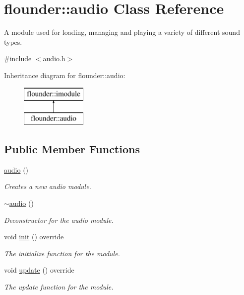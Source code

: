 \hypertarget{classflounder_1_1audio}{}\section{flounder\+:\+:audio Class Reference}
\label{classflounder_1_1audio}


A module used for loading, managing and playing a variety of different sound types.  




{\ttfamily \#include $<$audio.\+h$>$}

Inheritance diagram for flounder\+:\+:audio\+:\begin{figure}[H]
\begin{center}
\leavevmode
\includegraphics[height=2.000000cm]{classflounder_1_1audio}
\end{center}
\end{figure}
\subsection*{Public Member Functions}
\begin{DoxyCompactItemize}
\item 
\hyperlink{classflounder_1_1audio_a0aabbb226f542847145d89adb1144c16}{audio} ()
\begin{DoxyCompactList}\small\item\em Creates a new audio module. \end{DoxyCompactList}\item 
\hyperlink{classflounder_1_1audio_afb4d3bbb9ae399385a3abfe6e4e6d7ee}{$\sim$audio} ()
\begin{DoxyCompactList}\small\item\em Deconstructor for the audio module. \end{DoxyCompactList}\item 
void \hyperlink{classflounder_1_1audio_acc0f4ebb4b42b0ef055ef8dd14f1a9da}{init} () override
\begin{DoxyCompactList}\small\item\em The initialize function for the module. \end{DoxyCompactList}\item 
void \hyperlink{classflounder_1_1audio_aabff6a1996b8571404023b6ac17009b6}{update} () override
\begin{DoxyCompactList}\small\item\em The update function for the module. \end{DoxyCompactList}\end{DoxyCompactItemize}
